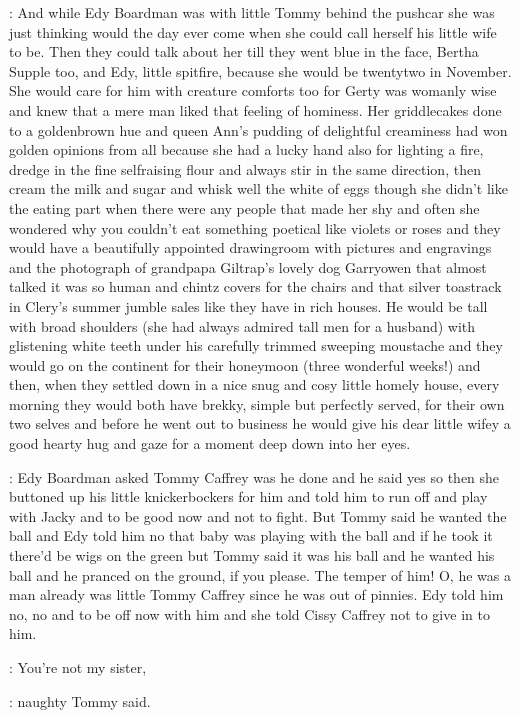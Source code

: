 :
And while Edy Boardman was with little Tommy behind the pushcar she was
just thinking would the day ever come when she could call herself his
little wife to be. Then they could talk about her till they went blue in
the face, Bertha Supple too, and Edy, little spitfire, because she would
be twentytwo in November. She would care for him with creature comforts
too for Gerty was womanly wise and knew that a mere man liked that
feeling of hominess. Her griddlecakes done to a goldenbrown hue and
queen Ann's pudding of delightful creaminess had won golden opinions from
all because she had a lucky hand also for lighting a fire, dredge in the
fine selfraising flour and always stir in the same direction, then cream
the milk and sugar and whisk well the white of eggs though she didn't like
the eating part when there were any people that made her shy and often she
wondered why you couldn't eat something poetical like violets or roses and
they would have a beautifully appointed drawingroom with pictures and
engravings and the photograph of grandpapa Giltrap's lovely dog
Garryowen that almost talked it was so human and chintz covers for the
chairs and that silver toastrack in Clery's summer jumble sales like they
have in rich houses. He would be tall with broad shoulders (she had always
admired tall men for a husband) with glistening white teeth under his
carefully trimmed sweeping moustache and they would go on the continent
for their honeymoon (three wonderful weeks!) and then, when they settled
down in a nice snug and cosy little homely house, every morning they
would both have brekky, simple but perfectly served, for their own two
selves and before he went out to business he would give his dear little
wifey a good hearty hug and gaze for a moment deep down into her eyes.

:
Edy Boardman asked Tommy Caffrey was he done and he said yes so
then she buttoned up his little knickerbockers for him and told him to run
off and play with Jacky and to be good now and not to fight. But Tommy
said he wanted the ball and Edy told him no that baby was playing with the
ball and if he took it there'd be wigs on the green but Tommy said it was
his ball and he wanted his ball and he pranced on the ground, if you
please. The temper of him! O, he was a man already was little Tommy
Caffrey since he was out of pinnies. Edy told him no, no and to be off now
with him and she told Cissy Caffrey not to give in to him.

\tommy:
You're not my sister,

:
naughty Tommy said.


